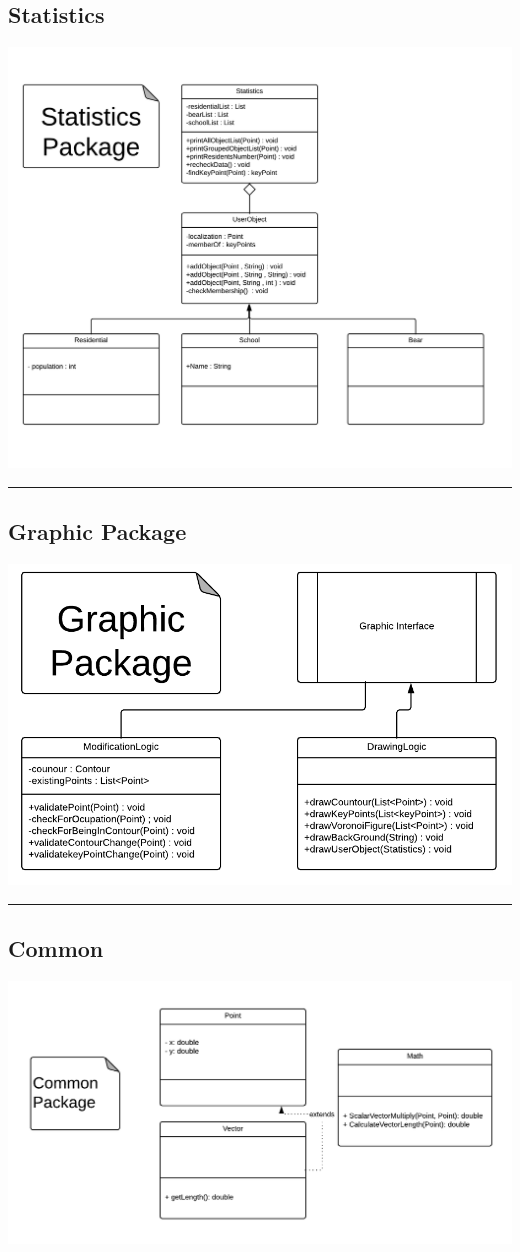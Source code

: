 \documentclass[a4paper,11pt]{article}
\newcommand{\linia}{\rule{\linewidth}{0.4mm}}
\begin{document}
\subsection{Statistics}
\includegraphics[scale=0.28]{statisticPackage.png} 

\noindent\linia
\subsection{Graphic Package}
\includegraphics[scale=0.75]{graphicPackage.png} 

\noindent\linia
\subsection{Common}
\includegraphics[scale=1]{commonPackage.png}
\end{document}
